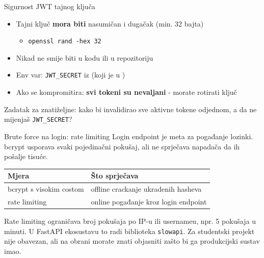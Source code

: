 \begin{frame}{Sigurnost JWT tajnog ključa}
	\begin{itemize}
		\item Tajni ključ \textbf{mora biti} nasumičan i dugačak (min. 32 bajta)
		\begin{itemize}
			\item \texttt{openssl rand -hex 32}
		\end{itemize}
		\item Nikad ne smije biti u kodu ili u repozitoriju
		\item Env var: \texttt{JWT\_SECRET} iz  (koji je u )
		\item Ako se kompromitira: \textbf{svi tokeni su nevaljani} - morate rotirati ključ
	\end{itemize}

	\vspace{0.6em}
	Zadatak za znatiželjne: kako bi invalidirao sve aktivne tokene odjednom, a da ne mijenjaš \texttt{JWT\_SECRET}?
\end{frame}

\begin{frame}{Brute force na login: rate limiting}
	Login endpoint je meta za pogađanje lozinki. bcrypt usporava svaki pojedinačni pokušaj, ali ne sprječava napadača da ih pošalje tisuće.

	\vspace{0.6em}
	\begin{tabular}{@{}ll@{}}
		\toprule
		\textbf{Mjera} & \textbf{Što sprječava} \\
		\midrule
		bcrypt s visokim costom & offline crackanje ukradenih hasheva \\
		rate limiting & online pogađanje kroz login endpoint \\
		\bottomrule
	\end{tabular}

	\vspace{0.6em}
	Rate limiting ograničava broj pokušaja po IP-u ili usernameu, npr. 5 pokušaja u minuti. U FastAPI ekosustavu to radi biblioteka \texttt{slowapi}. Za studentski projekt nije obavezan, ali na obrani morate znati objasniti zašto bi ga produkcijski sustav imao.
\end{frame}


